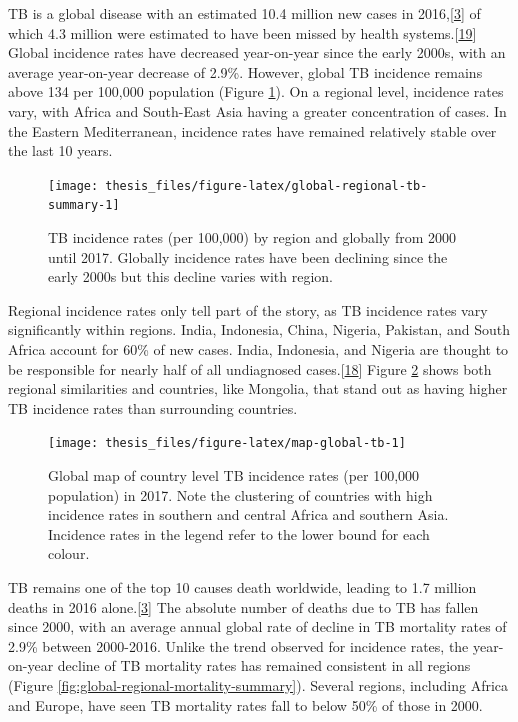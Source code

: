 \documentclass[11pt,twoside]{bristolthesis}
\begin{document}
  TB is a global disease with an estimated 10.4 million new cases in 2016,{[}\protect\hyperlink{ref-TheWorldHealthOrganization:2018va}{3}{]} of which 4.3 million were estimated to have been missed by health systems.{[}\protect\hyperlink{ref-WHO:2018}{19}{]} Global incidence rates have decreased year-on-year since the early 2000s, with an average year-on-year decrease of 2.9\%. However, global TB incidence remains above 134 per 100,000 population (Figure \ref{fig:global-regional-tb-summary}). On a regional level, incidence rates vary, with Africa and South-East Asia having a greater concentration of cases. In the Eastern Mediterranean, incidence rates have remained relatively stable over the last 10 years.
  \begin{figure}
  
  {\centering \texttt{[image: thesis\_files/figure-latex/global-regional-tb-summary-1]} 
  
  }
  
  \caption[TB incidence rates (per 100,000) by region and globally from 2000 until 2017.]{TB incidence rates (per 100,000) by region and globally from 2000 until 2017. Globally incidence rates have been declining since the early 2000s but this decline varies with region.}\label{fig:global-regional-tb-summary}
  \end{figure}
  Regional incidence rates only tell part of the story, as TB incidence rates vary significantly within regions. India, Indonesia, China, Nigeria, Pakistan, and South Africa account for 60\% of new cases. India, Indonesia, and Nigeria are thought to be responsible for nearly half of all undiagnosed cases.{[}\protect\hyperlink{ref-WHOTB2016}{18}{]} Figure \ref{fig:map-global-tb} shows both regional similarities and countries, like Mongolia, that stand out as having higher TB incidence rates than surrounding countries.
  \begin{figure}
  
  {\centering \texttt{[image: thesis\_files/figure-latex/map-global-tb-1]} 
  
  }
  
  \caption[Global map of country level TB incidence rates (per 100,000 population) in 201]{Global map of country level TB incidence rates (per 100,000 population) in 2017. Note the clustering of countries with high incidence rates in southern and central Africa and southern Asia. Incidence rates in the legend refer to the lower bound for each colour.}\label{fig:map-global-tb}
  \end{figure}
  TB remains one of the top 10 causes death worldwide, leading to 1.7 million deaths in 2016 alone.{[}\protect\hyperlink{ref-TheWorldHealthOrganization:2018va}{3}{]} The absolute number of deaths due to TB has fallen since 2000, with an average annual global rate of decline in TB mortality rates of 2.9\% between 2000-2016. Unlike the trend observed for incidence rates, the year-on-year decline of TB mortality rates has remained consistent in all regions (Figure \ref{fig:global-regional-mortality-summary}). Several regions, including Africa and Europe, have seen TB mortality rates fall to below 50\% of those in 2000.
\end{document}
